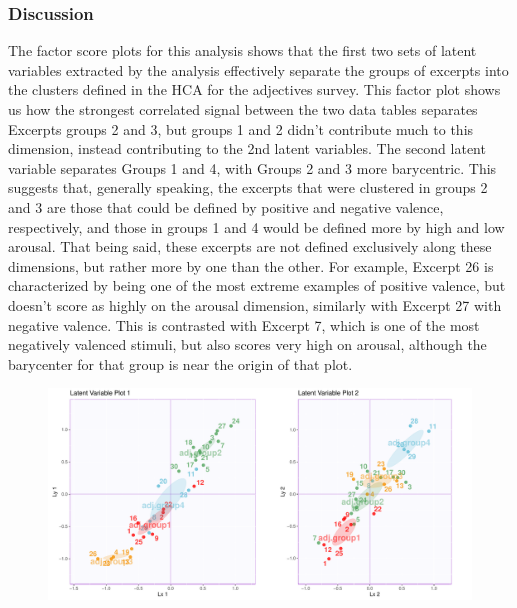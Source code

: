 \documentclass[
  english,
  man,floatsintext]{apa6}
\begin{document}
\hypertarget{discussion-2}{%
\subsubsection{Discussion}\label{discussion-2}}

The factor score plots for this analysis shows that the first two sets of latent variables extracted by the analysis effectively separate the groups of excerpts into the clusters defined in the HCA for the adjectives survey. This factor plot shows us how the strongest correlated signal between the two data tables separates Excerpts groups 2 and 3, but groups 1 and 2 didn't contribute much to this dimension, instead contributing to the 2nd latent variables. The second latent variable separates Groups 1 and 4, with Groups 2 and 3 more barycentric. This suggests that, generally speaking, the excerpts that were clustered in groups 2 and 3 are those that could be defined by positive and negative valence, respectively, and those in groups 1 and 4 would be defined more by high and low arousal. That being said, these excerpts are not defined exclusively along these dimensions, but rather more by one than the other. For example, Excerpt 26 is characterized by being one of the most extreme examples of positive valence, but doesn't score as highly on the arousal dimension, similarly with Excerpt 27 with negative valence. This is contrasted with Excerpt 7, which is one of the most negatively valenced stimuli, but also scores very high on arousal, although the barycenter for that group is near the origin of that plot.

\begin{figure}

{\centering \includegraphics{Music-Descriptor-Space_files/figure-latex/factorplotsPLSC-1} 

}

\caption{ }\label{fig:factorplotsPLSC}
\end{figure}
\end{document}
